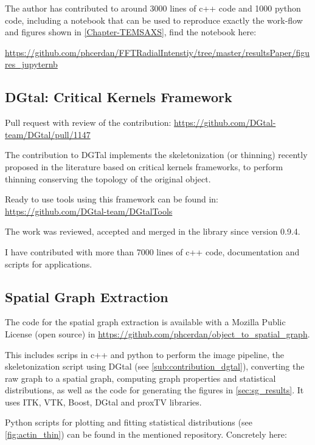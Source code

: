 The author has contributed to around 3000 lines of c++ code and 1000 python code, including a notebook that can be used to reproduce exactly the work-flow and figures shown in \autoref{Chapter-TEMSAXS}, find the notebook here:

\noindent\url{https://github.com/phcerdan/FFTRadialIntenstiy/tree/master/resultsPaper/figures_jupyternb}

\subsection{DGtal: Critical Kernels Framework}%
\label{sub:contribution_dgtal}

Pull request with review of the contribution:
\url{https://github.com/DGtal-team/DGtal/pull/1147}

The contribution to DGTal implements the skeletonization (or thinning) recently proposed in the
literature \cite{couprie_3d_2015, bertrand_parallel_2017} based on critical kernels frameworks, to perform thinning conserving the topology of the original object.

Ready to use tools using this framework can be found in:
\url{https://github.com/DGtal-team/DGtalTools}

The work was reviewed, accepted and merged in the library since version 0.9.4.

I have contributed with more than 7000 lines of c++ code, documentation and scripts for applications.

\subsection{Spatial Graph Extraction}%
\label{sub:spatial_graph_extraction}

The code for the spatial graph extraction is available with a Mozilla Public License (open source) in
\url{https://github.com/phcerdan/object_to_spatial_graph}.

This includes scrips in c++ and python to perform the image pipeline, the skeletonization script using DGtal (see \autoref{sub:contribution_dgtal}), converting the raw graph to a spatial graph, computing graph properties and statistical distributions, as well as the code for generating the figures in \autoref{sec:sg_results}. It uses ITK, VTK, Boost, DGtal and proxTV libraries.

Python scripts for plotting and fitting statistical distributions (see \autoref{fig:actin_thin}) can be found in the mentioned repository. Concretely here:


